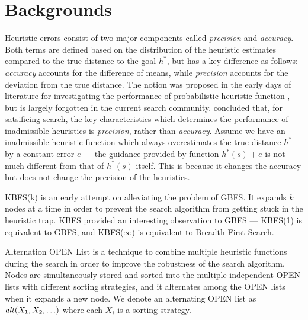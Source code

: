 
\section{Backgrounds}

Heuristic errors consist of two major components called \emph{precision}
and \emph{accuracy}. Both terms are defined based on the distribution of
the heuristic estimates compared to the true distance to the goal $h^*$,
but has a key difference as follows: \emph{accuracy} accounts for the
difference of means, while \emph{precision} accounts for the deviation
from the true distance. The notion was proposed in the early days of
literature for investigating the performance of probabilistic heuristic
function \cite{pearl1984heuristics}, but is largely forgotten in the
current search community. \citeauthor{pearl1984heuristics}
concluded that, for satsificing search, the key characteristics which
determines the performance of inadmissible heuristics is
\emph{precision}, rather than \emph{accuracy}. Assume we have an
inadmissible heuristic function which always overestimates the true
distance $h^*$ by a constant error $e$ --- the guidance provided by
function $h^*(s)+e$ is not much different from that of $h^*(s)$
itself. This is because it changes the accuracy but does not change
the precision of the heuristics.

KBFS(k) \cite{Korf??} is an early attempt on alleviating the problem of
GBFS. It expands $k$ nodes at a time in order to prevent the search
algorithm from getting stuck in the heuristic trap. KBFS provided an
interesting observation to GBFS --- KBFS(1) is equivalent to GBFS, and
KBFS($\infty$) is equivalent to Breadth-First Search.

Alternation OPEN List \cite{RogerH10} is a technique to combine multiple
heuristic functions during the search in order to improve the robustness
of the search algorithm. Nodes are simultaneously stored and sorted into the
multiple independent OPEN lists with different sorting strategies, and
it alternates among the OPEN lists when it expands a new node.
We denote an alternating OPEN list as $\mit{alt}(X_1,X_2,\ldots)$ where
each $X_i$ is a sorting strategy.

